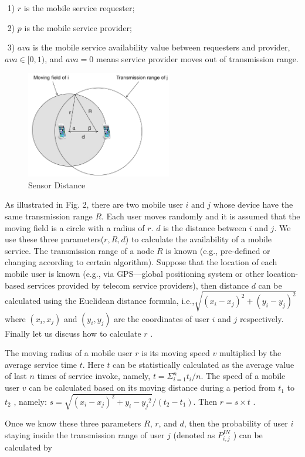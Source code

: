 \documentclass[10pt,journal,compsoc]{IEEEtran}
\begin{document}
​	1) $r$ is the mobile service requester;

​	2) $p$ is the mobile service provider;

​	3) $ava$ is the mobile service availability value between requesters and provider, $ava \in [0,1)$, and $ava=0$ means service provider moves out of transmission range.


\begin{figure}[!t]
\centering
\includegraphics[width=2.5in]{./img/fig3.jpg}
\caption{Sensor Distance}
\label{fig_sd}
\end{figure}

As illustrated in Fig. 2, there are two mobile user $i$ and $j$ whose device have the same transmission range $R$. Each user moves randomly and it is assumed that the moving field is a circle with a radius of $r$. $d$ is the distance between $i$ and $j$. We use these three parameters($r,R,d$) to calculate the availability of a mobile service. The transmission range of a node $R$ is known (e.g., pre-defined or changing according to certain algorithm). Suppose that the location of each mobile user is known (e.g., via GPS—global positioning system or other location-based services provided by telecom service providers\cite{chadil2008real}), then distance $d$ can be calculated using the Euclidean distance formula, i.e.,$\sqrt{{(x_i-x_j)^2}+({y_i-y_j})^2}$ where $(x_i, x_j)$ and $(y_i, y_j)$ are the coordinates of user $i$ and $j$ respectively. Finally let us discuss how to calculate $r$ \cite{Yang2010}.

The moving radius of a mobile user $r$ is its moving speed $v$ multiplied by the average service time $t$. Here $t$ can be statistically calculated as the average value of last $n$ times of service invoke, namely, $t = \Sigma_{i=1}^{n}t_i/n$. The speed of a mobile user $v$ can be calculated based on its moving distance during a period from $t_1$ to $t_2$ \cite{ko2000location}, namely: $s = \sqrt{{(x_i-x_j)^2}+{y_i-y_j}^2}/(t_2-t_1)$. Then $r = s \times t$ \cite{Yang2010}.

​Once we know these three parameters $R$, $r$, and $d$, then the probability of user $i$ staying inside the transmission range of user $j$ (denoted as $P_{i,j}^{IN}$ ) can be calculated by
\end{document}
